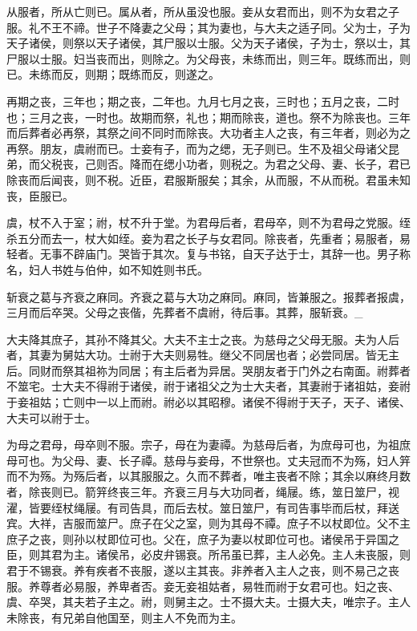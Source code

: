 \documentclass[]{article}
\begin{document}
从服者，所从亡则已。属从者，所从虽没也服。妾从女君而出，则不为女君之子服。礼不王不禘。世子不降妻之父母；其为妻也，与大夫之适子同。父为士，子为天子诸侯，则祭以天子诸侯，其尸服以士服。父为天子诸侯，子为士，祭以士，其尸服以士服。妇当丧而出，则除之。为父母丧，未练而出，则三年。既练而出，则已。未练而反，则期；既练而反，则遂之。

再期之丧，三年也；期之丧，二年也。九月七月之丧，三时也；五月之丧，二时也；三月之丧，一时也。故期而祭，礼也；期而除丧，道也。祭不为除丧也。三年而后葬者必再祭，其祭之间不同时而除丧。大功者主人之丧，有三年者，则必为之再祭。朋友，虞祔而已。士妾有子，而为之缌，无子则已。生不及祖父母诸父昆弟，而父税丧，己则否。降而在缌小功者，则税之。为君之父母、妻、长子，君已除丧而后闻丧，则不税。近臣，君服斯服矣；其余，从而服，不从而税。君虽未知丧，臣服已。

虞，杖不入于室；祔，杖不升于堂。为君母后者，君母卒，则不为君母之党服。绖杀五分而去一，杖大如绖。妾为君之长子与女君同。除丧者，先重者；易服者，易轻者。无事不辟庙门。哭皆于其次。复与书铭，自天子达于士，其辞一也。男子称名，妇人书姓与伯仲，如不知姓则书氏。

斩衰之葛与齐衰之麻同。齐衰之葛与大功之麻同。麻同，皆兼服之。报葬者报虞，三月而后卒哭。父母之丧偕，先葬者不虞祔，待后事。其葬，服斩衰。\_

大夫降其庶子，其孙不降其父。大夫不主士之丧。为慈母之父母无服。夫为人后者，其妻为舅姑大功。士祔于大夫则易牲。继父不同居也者；必尝同居。皆无主后。同财而祭其祖祢为同居；有主后者为异居。哭朋友者于门外之右南面。祔葬者不筮宅。士大夫不得祔于诸侯，祔于诸祖父之为士大夫者，其妻祔于诸祖姑，妾祔于妾祖姑；亡则中一以上而祔。祔必以其昭穆。诸侯不得祔于天子，天子、诸侯、大夫可以祔于士。

为母之君母，母卒则不服。宗子，母在为妻禫。为慈母后者，为庶母可也，为祖庶母可也。为父母、妻、长子禫。慈母与妾母，不世祭也。丈夫冠而不为殇，妇人笄而不为殇。为殇后者，以其服服之。久而不葬者，唯主丧者不除；其余以麻终月数者，除丧则已。箭笄终丧三年。齐衰三月与大功同者，绳屦。练，筮日筮尸，视濯，皆要绖杖绳屦。有司告具，而后去杖。筮日筮尸，有司告事毕而后杖，拜送宾。大祥，吉服而筮尸。庶子在父之室，则为其母不禫。庶子不以杖即位。父不主庶子之丧，则孙以杖即位可也。父在，庶子为妻以杖即位可也。诸侯吊于异国之臣，则其君为主。诸侯吊，必皮弁锡衰。所吊虽已葬，主人必免。主人未丧服，则君于不锡衰。养有疾者不丧服，遂以主其丧。非养者入主人之丧，则不易己之丧服。养尊者必易服，养卑者否。妾无妾祖姑者，易牲而祔于女君可也。妇之丧、虞、卒哭，其夫若子主之。祔，则舅主之。士不摄大夫。士摄大夫，唯宗子。主人未除丧，有兄弟自他国至，则主人不免而为主。
\end{document}
